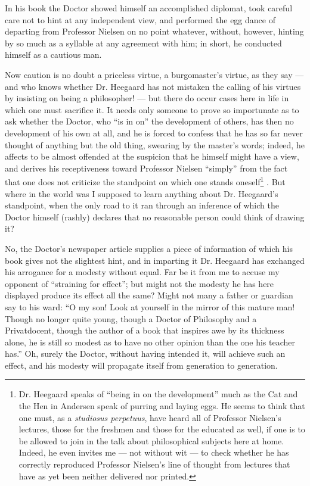 \documentclass[12pt,a4paper,openany]{book}
\renewcommand{\thefootnote}{*)}
\newcommand{\fnmark}[2]{\renewcommand{\thefootnote}{#1}\footnote{#2}%
  \renewcommand{\thefootnote}{*)}}
\newcommand{\opage}[1]{\marginnote{\footnotesize\textit{[#1]}}}
\begin{document}
In his book the Doctor showed himself an accomplished diplomat,
took careful care not to hint at any independent view, and
performed the egg dance of departing from Professor Nielsen on no
point whatever, without, however, hinting by so much as a syllable
at any agreement with him; in short, he conducted himself as a
cautious man.

Now caution is no doubt a priceless virtue, a burgomaster's virtue,
as they say --- and who knows whether Dr. Heegaard has not mistaken
the calling of his virtues by insisting on being a philosopher! ---
but there do occur cases here in life in which one must sacrifice
it. It needs only someone to prove so importunate as to ask whether
the Doctor, who ``is in on'' the development of others, has then no
development of his own at all, and he is forced to confess that he
has so far never thought of anything but the old thing, swearing by
the master's words; indeed, he affects to be almost offended at the
suspicion that he himself might have a view, and derives his
receptiveness toward Professor Nielsen
\opage{36}``simply'' from the fact that one does not criticize the
standpoint on which one stands oneself\fnmark{*)}{Dr. Heegaard speaks of ``being in on the development'' much as the
Cat and the Hen in Andersen speak of purring and laying eggs. He seems
to think that one must, as a \emph{studiosus perpetuus}, have heard all of
Professor Nielsen's lectures, those for the freshmen and those for the
educated as well, if one is to be allowed to join in the talk about
philosophical subjects here at home. Indeed, he even invites me --- not
without wit --- to check whether he has correctly reproduced Professor
Nielsen's line of thought from lectures that have as yet been neither
delivered nor printed.}. But where in the world was I supposed to learn
anything about Dr. Heegaard's standpoint, when the only road to it
ran through an inference of which the Doctor himself (rashly)
declares that no reasonable person could think of drawing it?

No, the Doctor's newspaper article supplies a piece of information
of which his book gives not the slightest hint, and in imparting it
Dr. Heegaard has exchanged his arrogance for a modesty without
equal. Far be it from me to accuse my opponent of ``straining for
effect''; but might not the modesty he has here displayed produce
its effect all the same? Might not many a father or guardian say to
his ward: ``O my son! Look at yourself in the mirror of this mature
man! Though no longer quite young, though a Doctor of Philosophy and
a Privatdocent, though the author of a book that inspires awe by its
thickness alone, he is still so modest as to have no other opinion
than the one his teacher has.'' Oh, surely the Doctor, without
having intended it, will achieve such an effect, and his modesty
will propagate itself from generation to generation.
\end{document}
